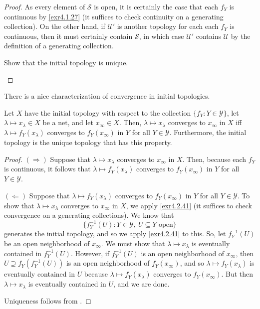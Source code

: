 \begin{prp}
\begin{proof}
As every element of $\mathcal{S}$ is open, it is certainly the case that each $f_Y$ is continuous by \cref{exr4.1.27} (it suffices to check continuity on a generating collection).  On the other hand, if $\mathcal{U}'$ is another topology for each each $f_Y$ is continuous, then it must certainly contain $\mathcal{S}$, in which case $\mathcal{U}'$ contains $\mathcal{U}$ by the definition of a generating collection.

\begin{exr}
Show that the initial topology is unique.
\end{exr}
\end{proof}
\end{prp}
There is a nice characterization of convergence in initial topologies.
\begin{prp}\label{prp4.4.5}
Let $X$ have the initial topology with respect to the collection $\{ f_Y:Y\in \mathcal{Y}\}$, let $\lambda \mapsto x_\lambda \in X$ be a net, and let $x_\infty \in X$.  Then, $\lambda \mapsto x_\lambda$ converges to $x_\infty$ in $X$ iff $\lambda \mapsto f_Y(x_\lambda )$ converges to $f_Y(x_\infty )$ in $Y$ for all $Y\in \mathcal{Y}$.  Furthermore, the initial topology is the unique topology that has this property.
\begin{proof}
$(\Rightarrow )$ Suppose that $\lambda \mapsto x_\lambda$ converges to $x_\infty$ in $X$.  Then, because each $f_Y$ is continuous, it follows that $\lambda \mapsto f_Y(x_\lambda )$ converges to $f_Y(x_\infty )$ in $Y$ for all $Y\in \mathcal{Y}$.

\blankline
\noindent
$(\Leftarrow )$ Suppose that $\lambda \mapsto f_Y(x_\lambda )$ converges to $f_Y(x_\infty )$ in $Y$ for all $Y\in \mathcal{Y}$.  To show that $\lambda \mapsto x_\lambda$ converges to $x_\infty$ in $X$, we apply \cref{exr4.2.41} (it suffices to check convergence on a generating collections).  We know that
\begin{equation}
\{ f_Y^{-1}(U):Y\in \mathcal{Y},\ U\subseteq Y\text{ open}\}
\end{equation}
generates the initial topology, and so we apply \cref{exr4.2.41} to this.  So, let $f_Y^{-1}(U)$ be an open neighborhood of $x_\infty$.  We must show that $\lambda \mapsto x_\lambda$ is eventually contained in $f_Y^{-1}(U)$.  However, if $f_Y^{-1}(U)$ is an open neighborhood of $x_\infty$, then $U\supseteq f_Y(f_Y^{-1}(U))$ is an open neighborhood of $f_Y(x_\infty )$, and so $\lambda \mapsto f_Y(x_\lambda )$ is eventually contained in $U$ because $\lambda \mapsto f_Y(x_\lambda )$ converges to $f_Y(x_\infty )$.  But then $\lambda \mapsto x_\lambda$ is eventually contained in $U$, and we are done.

\blankline
\noindent
Uniqueness follows from .
\end{proof}
\end{prp}
